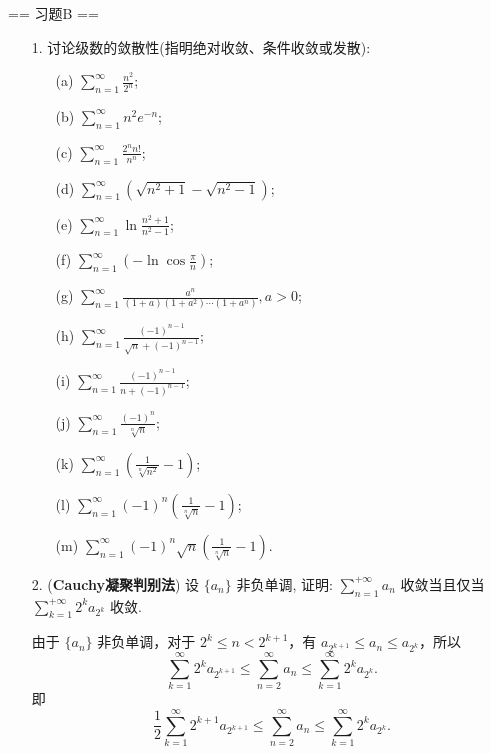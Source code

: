 == 习题B ==
\begin{enumerate}
    \item[1.]讨论级数的敛散性(指明绝对收敛、条件收敛或发散):
    \begin{enumerate}
        \item[(a)]$\displaystyle \sum_{n = 1}^{\infty}\frac{n^{2}}{2^{n}}$;
        \item[(b)]$\displaystyle \sum_{n = 1}^{\infty}n^{2}e^{-n}$;
        \item[(c)]$\displaystyle \sum_{n = 1}^{\infty}\frac{2^{n}n!}{n^{n}}$;
        \item[(d)]$\displaystyle \sum_{n = 1}^{\infty}\left(\sqrt{n^{2} + 1} -\sqrt{n^{2} - 1}\right)$;
        \item[(e)]$\displaystyle \sum_{n = 1}^{\infty}\ln \frac{n^{2} + 1}{n^{2} - 1}$;
        \item[(f)]$\displaystyle \sum_{n = 1}^{\infty}\left(-\ln \cos \frac{\pi}{n}\right)$;
        \item[(g)]$\displaystyle \sum_{n = 1}^{\infty}\frac{a^{n}}{(1 + a)(1 + a^{2})\cdots(1 + a^{n})},a > 0$;
        \item[(h)]$\displaystyle \sum_{n = 1}^{\infty}\frac{(-1)^{n-1}}{\sqrt{n}+(-1)^{n-1}}$;
        \item[(i)]$\displaystyle \sum_{n = 1}^{\infty}\frac{(-1)^{n-1}}{n+(-1)^{n-1}}$;
        \item[(j)]$\displaystyle \sum_{n = 1}^{\infty}\frac{(-1)^n}{\sqrt[n]{n}}$;
        \item[(k)]$\displaystyle \sum_{n = 1}^{\infty}\left( \frac{1}{\sqrt[n]{n^2}}-1 \right)$;
        \item[(l)]$\displaystyle \sum_{n = 1}^{\infty}(-1)^n\left( \frac{1}{\sqrt[n]{n}}-1 \right)$;
        \item[(m)]$\displaystyle \sum_{n = 1}^{\infty}(-1)^n\sqrt{n}\left( \frac{1}{\sqrt[n]{n}}-1 \right)$.
    \end{enumerate}
    \item[2.](\textbf{Cauchy凝聚判别法}) 设 \(\{a_{n}\}\) 非负单调, 证明: \(\displaystyle\sum_{n = 1}^{+\infty}a_{n}\) 收敛当且仅当 \(\displaystyle\sum_{k = 1}^{+\infty}2^{k}a_{2^{k}}\) 收敛.
    \begin{solution}
        由于 $\{a_n\}$ 非负单调，对于 $2^k \leq n < 2^{k+1}$，有 $a_{2^{k+1}} \leq a_n \leq a_{2^k}$，所以
        \[ \sum_{k=1}^{\infty} 2^k a_{2^{k+1}} \leq \sum_{n=2}^{\infty} a_n \leq \sum_{k=1}^{\infty} 2^k a_{2^k}. \]
        即
        \[ \frac{1}{2} \sum_{k=1}^{\infty} 2^{k+1} a_{2^{k+1}} \leq \sum_{n=2}^{\infty} a_n \leq \sum_{k=1}^{\infty} 2^k a_{2^k}.\]

\end{solution}
\end{enumerate}
